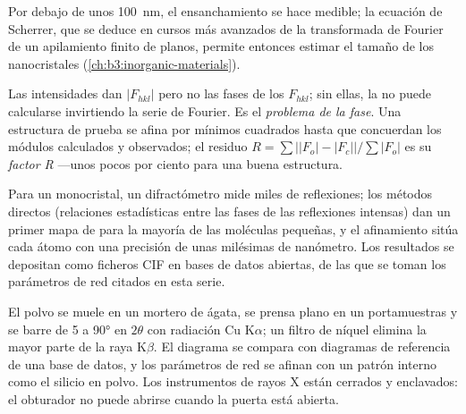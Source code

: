 Por debajo de unos \qty{100}{nm}, el ensanchamiento se hace medible; la ecuación de
Scherrer, que se deduce en cursos más avanzados de la transformada de Fourier de un
apilamiento finito de planos, permite entonces estimar el tamaño de los nanocristales
(\cref{ch:b3:inorganic-materials}).

\begin{definition}\label{def:b3:x-ray-diffraction:refinement}
Las intensidades dan $|F_{hkl}|$ pero no las fases de los $F_{hkl}$; sin
ellas, la  no puede calcularse invirtiendo la serie de
Fourier. Es el \emph{problema de la fase}. Una estructura de prueba
se afina por mínimos cuadrados hasta que concuerdan los módulos calculados y observados; el
residuo $R = \sum\big||F_o| - |F_c|\big|/\sum|F_o|$ es su \emph{factor
R} ---unos pocos por ciento para una buena estructura.
\end{definition}

Para un monocristal, un difractómetro mide miles de reflexiones; los
métodos directos (relaciones estadísticas entre las fases de las reflexiones
intensas) dan un primer mapa de  para la mayoría de las moléculas pequeñas, y el
afinamiento sitúa cada átomo con una precisión de unas milésimas de nanómetro. Los
resultados se depositan como ficheros CIF en bases de datos abiertas, de las que se toman los
parámetros de red citados en esta serie.

\begin{inthelab}
El polvo se muele en un mortero de ágata, se prensa plano en un portamuestras y se
barre de 5 a \ang{90} en $2\theta$ con radiación Cu K$\alpha$; un filtro de
níquel elimina la mayor parte de la raya K$\beta$. El diagrama se compara con
diagramas de referencia de una base de datos, y los parámetros de red se afinan con
un patrón interno como el silicio en polvo. Los instrumentos de rayos X están cerrados
y enclavados: el obturador no puede abrirse cuando la puerta está abierta.
\end{inthelab}

